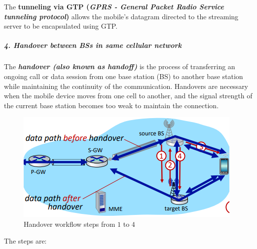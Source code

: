 \documentclass[10pt,a4paper]{report}
\theoremstyle{definition}
\begin{document}
The \textbf{tunneling via GTP (\textit{GPRS - General Packet Radio Service tunneling protocol})} allows the mobile's datagram directed to the streaming server to be encapsulated using GTP.

\subparagraph{4. Handover between BSs in same cellular network}
The \textit{\textbf{handover (also known as handoff)}} is the process of transferring an ongoing call or data session from one base station (BS) to another base station while maintaining the continuity of the communication. Handovers are necessary when the mobile device moves from one cell to another, and the signal strength of the current base station becomes too weak to maintain the connection.

\begin{figure}[h]
	\centering\includegraphics[scale=0.60]{images/Pasted image 20230322120944.png}
	\caption{Handover workflow steps from $1$ to $4$}
	\label{handover-BS}
\end{figure}
The steps are:
\end{document}
